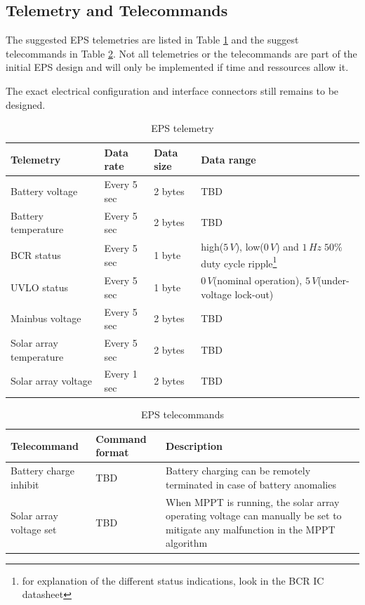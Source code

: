 \subsection{Telemetry and Telecommands}
The suggested \ac{EPS} telemetries are listed in Table \ref{tab:Telemetry} and the suggest telecommands in Table \ref{tab:Telecommands}. Not all telemetries or the telecommands are part of the initial \ac{EPS} design and will only be implemented if time and ressources allow it.

The exact electrical configuration and interface connectors still remains to be designed.
%
\begin{table}[H]
\centering
\caption{\ac{EPS} telemetry}
\label{tab:Telemetry}
\begin{tabular}{|p{}p{}p{}p{}|}
\hline
\textbf{Telemetry} & \textbf{Data rate} & \textbf{Data size} & \textbf{Data range}\\
\hline
Battery voltage & Every 5 sec & 2 bytes & \ac{TBD}\\
\hline
Battery temperature & Every 5 sec & 2 bytes & \ac{TBD}\\
\hline
BCR status & Every 5 sec & 1 byte & high($5\,V$), low($0\,V$) and $1\,Hz\;50\%$ duty cycle ripple\footnote{for explanation of the different status indications, look in the \ac{BCR} \ac{IC} datasheet}\\
\hline
\ac{UVLO} status & Every 5 sec & 1 byte &  $0\,V$(nominal operation), $5\,V$(under-voltage lock-out)\\
\hline
Mainbus voltage & Every 5 sec & 2 bytes & \ac{TBD}\\
\hline
Solar array temperature & Every 5 sec & 2 bytes & \ac{TBD}\\
\hline
Solar array voltage & Every 1 sec & 2 bytes & \ac{TBD}\\
\hline
\end{tabular}
\end{table}
%
\begin{table}[H]
\centering
\caption{\ac{EPS} telecommands}
\label{tab:Telecommands}
\begin{tabular}{|p{}p{}p{}|}
\hline
\textbf{Telecommand} & \textbf{Command format} & \textbf{Description}\\
\hline
Battery charge inhibit & \ac{TBD} & Battery charging can be remotely terminated in case of battery anomalies\\
\hline
Solar array voltage set & \ac{TBD} & When \ac{MPPT} is running, the solar array operating voltage can manually be set to mitigate any malfunction in the \ac{MPPT} algorithm\\
\hline
\end{tabular}
\end{table}



